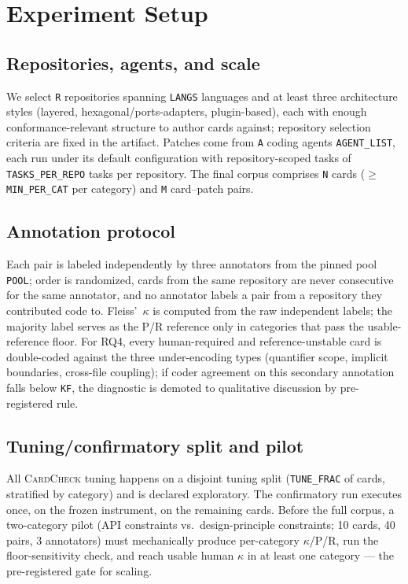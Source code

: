 \documentclass[conference]{IEEEtran}
\newcommand{\ph}[1]{\colorbox{yellow!35}{\texttt{\footnotesize #1}}}
\newcommand{\cardcheck}{\textsc{CardCheck}}
\begin{document}
\section{Experiment Setup}\label{sec:setup}

\subsection{Repositories, agents, and scale}
We select \ph{R} repositories spanning \ph{LANGS} languages and at least three
architecture styles (layered, hexagonal/ports-adapters, plugin-based), each with
enough conformance-relevant structure to author cards against; repository
selection criteria are fixed in the artifact. Patches come from \ph{A} coding
agents \ph{AGENT\_LIST}, each run under its default configuration with
repository-scoped tasks of \ph{TASKS\_PER\_REPO} tasks per repository. The final
corpus comprises \ph{N} cards ($\geq$ \ph{MIN\_PER\_CAT} per category) and
\ph{M} card--patch pairs.

\subsection{Annotation protocol}
Each pair is labeled independently by three annotators from the pinned pool
\ph{POOL}; order is randomized, cards from the same repository are never
consecutive for the same annotator, and no annotator labels a pair from a
repository they contributed code to. Fleiss'~$\kappa$ is computed from the raw
independent labels; the majority label serves as the P/R reference only in
categories that pass the usable-reference floor. For RQ4, every human-required
and reference-unstable card is double-coded against the three under-encoding
types (quantifier scope, implicit boundaries, cross-file coupling); if coder
agreement on this secondary annotation falls below \ph{KF}, the diagnostic is
demoted to qualitative discussion by pre-registered rule.

\subsection{Tuning/confirmatory split and pilot}
All \cardcheck{} tuning happens on a disjoint tuning split
(\ph{TUNE\_FRAC} of cards, stratified by category) and is declared exploratory.
The confirmatory run executes once, on the frozen instrument, on the remaining
cards. Before the full corpus, a two-category pilot (API constraints vs.\
design-principle constraints; 10 cards, 40 pairs, 3 annotators) must
mechanically produce per-category $\kappa$/P/R, run the floor-sensitivity
check, and reach usable human $\kappa$ in at least one category --- the
pre-registered gate for scaling.
\end{document}

